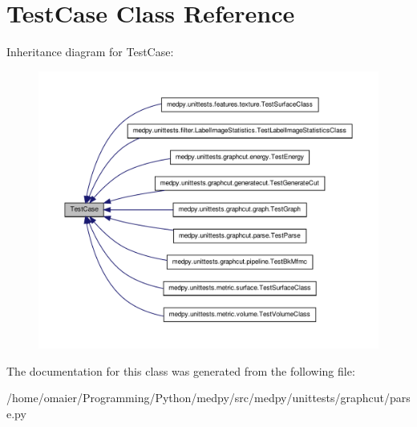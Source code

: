 \hypertarget{classunittest_1_1TestCase}{
\section{TestCase Class Reference}
\label{classunittest_1_1TestCase}
}


Inheritance diagram for TestCase:\nopagebreak
\begin{figure}[H]
\begin{center}
\leavevmode
\includegraphics[width=400pt]{classunittest_1_1TestCase__inherit__graph}
\end{center}
\end{figure}


The documentation for this class was generated from the following file:\begin{DoxyCompactItemize}
\item 
/home/omaier/Programming/Python/medpy/src/medpy/unittests/graphcut/parse.py\end{DoxyCompactItemize}
